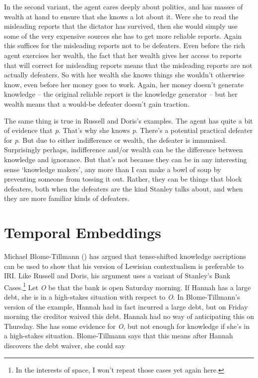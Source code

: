 \documentclass[
  10pt,
  letterpaper,
  DIV=11,
  numbers=noendperiod,
  twoside]{scrartcl}
\begin{document}
In the second variant, the agent cares deeply about politics, and has
masses of wealth at hand to ensure that she knows a lot about it. Were
she to read the misleading reports that the dictator has survived, then
she would simply use some of the very expensive sources she has to get
more reliable reports. Again this suffices for the misleading reports
not to be defeaters. Even before the rich agent exercises her wealth,
the fact that her wealth gives her access to reports that will correct
for misleading reports means that the misleading reports are not
actually defeaters. So with her wealth she knows things she wouldn't
otherwise know, even before her money goes to work. Again, her money
doesn't generate knowledge -- the original reliable report is the
knowledge generator -- but her wealth means that a would-be defeater
doesn't gain traction.

The same thing is true in Russell and Doris's examples. The agent has
quite a bit of evidence that \emph{p}. That's why she knows \emph{p}.
There's a potential practical defeater for \emph{p}. But due to either
indifference or wealth, the defeater is immunised. Surprisingly perhaps,
indifference and/or wealth can be the difference between knowledge and
ignorance. But that's not because they can be in any interesting sense
`knowledge makers', any more than I can make a bowl of soup by
preventing someone from tossing it out. Rather, they can be things that
block defeaters, both when the defeaters are the kind Stanley talks
about, and when they are more familiar kinds of defeaters.

\section{Temporal Embeddings}\label{sect:time}

Michael Blome-Tillmann () has argued that
tense-shifted knowledge ascriptions can be used to show that his version
of Lewisian contextualism is preferable to IRI. Like Russell and Doris,
his argument uses a variant of Stanley's Bank Cases.\footnote{In the
  interests of space, I won't repeat those cases yet again here.} Let
\emph{O} be that the bank is open Saturday morning. If Hannah has a
large debt, she is in a high-stakes situation with respect to \emph{O}.
In Blome-Tillmann's version of the example, Hannah had in fact incurred
a large debt, but on Friday morning the creditor waived this debt.
Hannah had no way of anticipating this on Thursday. She has some
evidence for \emph{O}, but not enough for knowledge if she's in a
high-stakes situation. Blome-Tillmann says that this means after Hannah
discovers the debt waiver, she could say
\end{document}
